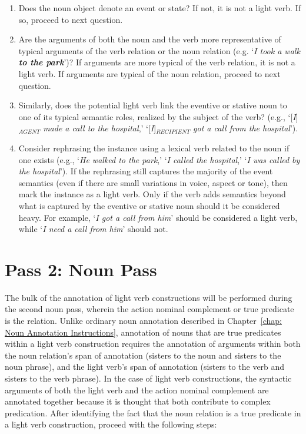 \documentclass[11pt]{report}
\begin{document}
\begin{enumerate}
\item Does the noun object denote an event or state? If not, it is not a light verb.  If so, proceed to next question. 

\item Are the arguments of both the noun and the verb more representative of typical arguments of the verb relation or the noun relation (e.g. `\textit{I took a walk \textbf{to the park}}')? If arguments are more typical of the verb relation, it is not a light verb.  If arguments are typical of the noun relation, proceed to next question.

\item Similarly, does the potential light verb link the eventive or stative noun to one of its typical semantic roles, realized by the subject of the verb? (e.g., `[\textit{I}]$_{AGENT}$ \textit{made a call to the hospital},' `[\textit{I}]$_{RECIPIENT}$ \textit{got a call from the hospital}').

\item Consider rephrasing the instance using a lexical verb related to the noun if one exists (e.g., `\textit{He walked to the park},' `\textit{I called the hospital},' `\textit{I was called by the hospital}'). If the rephrasing still captures the majority of the event semantics (even if there are small variations in voice, aspect or tone), then mark the instance as a light verb. Only if the verb adds semantics beyond what is captured by the eventive or stative noun should it be considered heavy.  For example, `\textit{I got a call from him}' should be considered a light verb, while `\textit{I need a call from him}' should not.  
\end{enumerate}

\section{Pass 2: Noun Pass}
The bulk of the annotation of light verb constructions will be performed during the second noun pass, wherein the action nominal complement or true predicate is the relation.  Unlike ordinary noun annotation described in Chapter~\ref{chap: Noun Annotation Instructions}, annotation of nouns that are true predicates within a light verb construction requires the annotation of arguments within both the noun relation's span of annotation (sisters to the noun and sisters to the noun phrase), and the light verb's span of annotation (sisters to the verb and sisters to the verb phrase).  In the case of light verb constructions, the syntactic arguments of both the light verb and the action nominal complement are annotated together because it is thought that both contribute to complex predication.  After identifying the fact that the noun relation is a true predicate in a light verb construction, proceed with the following steps:
\end{document}
